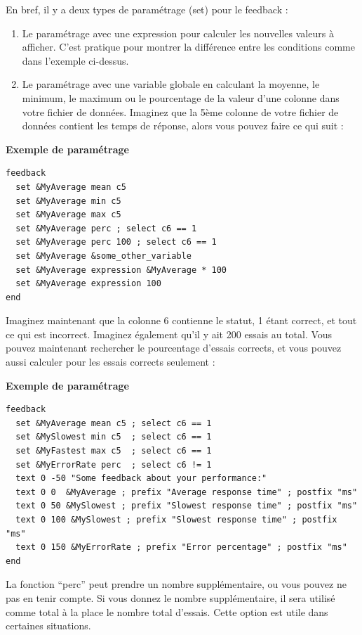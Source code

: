 \documentclass[
]{book}
\begin{document}
En bref, il y a deux types de paramétrage (set) pour le feedback :

\begin{enumerate}
\def\labelenumi{\arabic{enumi})}
\item
  Le paramétrage avec une expression pour calculer les nouvelles valeurs
  à afficher. C'est pratique pour montrer la différence entre les
  conditions comme dans l'exemple ci-dessus.
\item
  Le paramétrage avec une variable globale en calculant la moyenne, le
  minimum, le maximum ou le pourcentage de la valeur d'une colonne dans
  votre fichier de données. Imaginez que la 5ème colonne de votre
  fichier de données contient les temps de réponse, alors vous pouvez
  faire ce qui suit :
\end{enumerate}

\textbf{Exemple de paramétrage}

\begin{verbatim}
feedback
  set &MyAverage mean c5
  set &MyAverage min c5
  set &MyAverage max c5
  set &MyAverage perc ; select c6 == 1
  set &MyAverage perc 100 ; select c6 == 1
  set &MyAverage &some_other_variable
  set &MyAverage expression &MyAverage * 100
  set &MyAverage expression 100
end
\end{verbatim}

Imaginez maintenant que la colonne 6 contienne le statut, 1 étant
correct, et tout ce qui est incorrect. Imaginez également qu'il y ait
200 essais au total. Vous pouvez maintenant rechercher le pourcentage
d'essais corrects, et vous pouvez aussi calculer pour les essais
corrects seulement :

\textbf{Exemple de paramétrage}

\begin{verbatim}
feedback
  set &MyAverage mean c5 ; select c6 == 1
  set &MySlowest min c5  ; select c6 == 1
  set &MyFastest max c5  ; select c6 == 1
  set &MyErrorRate perc  ; select c6 != 1
  text 0 -50 "Some feedback about your performance:"
  text 0 0  &MyAverage ; prefix "Average response time" ; postfix "ms"
  text 0 50 &MySlowest ; prefix "Slowest response time" ; postfix "ms"
  text 0 100 &MySlowest ; prefix "Slowest response time" ; postfix "ms"
  text 0 150 &MyErrorRate ; prefix "Error percentage" ; postfix "ms"
end
\end{verbatim}

La fonction ``perc'' peut prendre un nombre supplémentaire, ou vous
pouvez ne pas en tenir compte. Si vous donnez le nombre supplémentaire,
il sera utilisé comme total à la place le nombre total d'essais. Cette
option est utile dans certaines situations.
\end{document}
